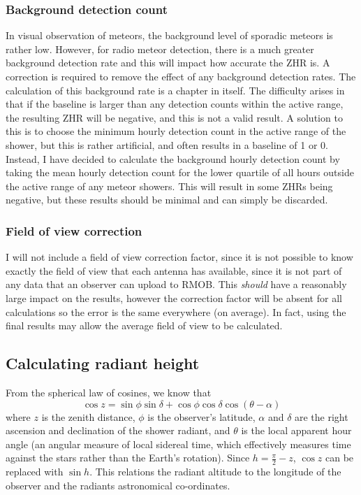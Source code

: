 \subsubsection{Background detection count}
In visual observation of meteors, the background level of sporadic meteors is rather low. However, for radio meteor detection, there is a much greater background detection rate and this will impact how accurate the ZHR is. A correction is required to remove the effect of any background detection rates. The calculation of this background rate is a chapter in itself. The difficulty arises in that if the baseline is larger than any detection counts within the active range, the resulting ZHR will be negative, and this is not a valid result. A solution to this is to choose the minimum hourly detection count in the active range of the shower, but this is rather artificial, and often results in a baseline of 1 or 0. Instead, I have decided to calculate the background hourly detection count by taking the mean hourly detection count for the lower quartile of all hours outside the active range of any meteor showers. This will result in some ZHRs being negative, but these results should be minimal and can simply be discarded.
\subsubsection{Field of view correction}
I will not include a field of view correction factor, since it is not possible to know exactly the field of view that each antenna has available, since it is not part of any data that an observer can upload to RMOB. This \textit{should} have a reasonably large impact on the results, however the correction factor will be absent for all calculations so the error is the same everywhere (on average). In fact, using the final results may allow the average field of view to be calculated.
\subsection{Calculating radiant height}
From the spherical law of cosines, we know that 
\[ \cos z =  \sin \phi \sin \delta + \cos \phi \cos \delta \cos \left(\theta - \alpha\right)\]
where $z$ is the zenith distance, $\phi$ is the observer's latitude, $\alpha$ and $\delta$ are the right ascension and declination of the shower radiant, and $\theta$ is the local apparent hour angle (an angular measure of local sidereal time, which effectively measures time against the stars rather than the Earth's rotation). Since $h = \frac{\pi}{2} - z$, $\cos z$ can be replaced with $\sin h$. This relations the radiant altitude to the longitude of the observer and the radiants astronomical co-ordinates.
